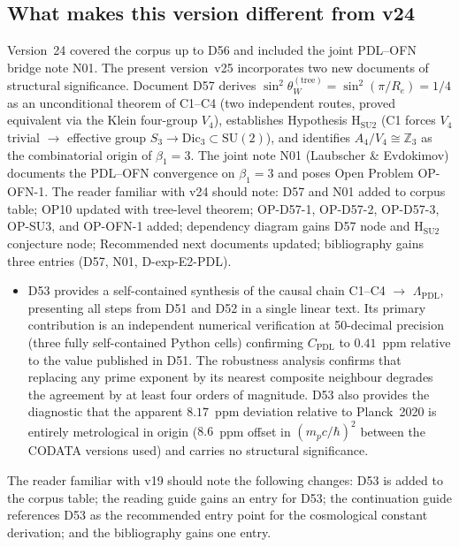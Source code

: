 \documentclass[11pt,a4paper]{article}
\theoremstyle{plain}
\theoremstyle{definition}
\theoremstyle{remark}
\begin{document}
\subsection{What makes this version different from v24}
\label{subsec:diffv24}
Version~24 covered the corpus up to D56 and included the joint PDL--OFN bridge note N01. The present version~v25 incorporates two new documents of structural significance. Document D57 derives $\sin^2\theta_W^{(\mathrm{tree})} = \sin^2(\pi/R_e) = 1/4$ as an unconditional theorem of C1--C4 (two independent routes, proved equivalent via the Klein four-group $V_4$), establishes Hypothesis H$_{\mathrm{SU2}}$ (C1 forces $V_4$ trivial $\to$ effective group $S_3 \to \mathrm{Dic}_3 \subset \mathrm{SU}(2)$), and identifies $A_4/V_4 \cong \mathbb{Z}_3$ as the combinatorial origin of $\beta_1 = 3$. The joint note N01 (Laubscher \& Evdokimov) documents the PDL--OFN convergence on $\beta_1=3$ and poses Open Problem OP-OFN-1. The reader familiar with v24 should note: D57 and N01 added to corpus table; OP10 updated with tree-level theorem; OP-D57-1, OP-D57-2, OP-D57-3, OP-SU3, and OP-OFN-1 added; dependency diagram gains D57 node and H$_{\mathrm{SU2}}$ conjecture node; Recommended next documents updated; bibliography gains three entries (D57, N01, D-exp-E2-PDL).

\begin{itemize}
\item D53 provides a self-contained synthesis of the causal chain C1--C4 $\to$ $\Lambda_{\mathrm{PDL}}$, presenting all steps from D51 and D52 in a single linear text. Its primary contribution is an independent numerical verification at 50-decimal precision (three fully self-contained Python cells) confirming $C_{\mathrm{PDL}}$ to $0.41$~ppm relative to the value published in D51. The robustness analysis confirms that replacing any prime exponent by its nearest composite neighbour degrades the agreement by at least four orders of magnitude. D53 also provides the diagnostic that the apparent $8.17$~ppm deviation relative to Planck~2020 is entirely metrological in origin ($8.6$~ppm offset in $(m_p c/\hbar)^2$ between the CODATA versions used) and carries no structural significance.
\end{itemize}

The reader familiar with v19 should note the following changes: D53 is added to the corpus table; the reading guide gains an entry for D53; the continuation guide references D53 as the recommended entry point for the cosmological constant derivation; and the bibliography gains one entry.
\end{document}
